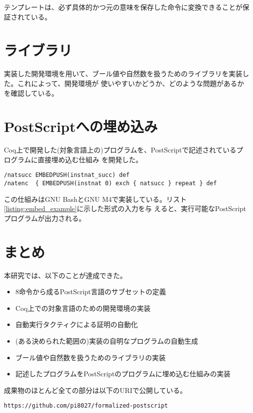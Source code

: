 \documentclass[a4paper, 10.5pt, twocolumn]{ujarticle}
\begin{document}
テンプレートは、必ず具体的かつ元の意味を保存した命令に変換できることが保証されている。

\section*{ライブラリ}

実装した開発環境を用いて、ブール値や自然数を扱うためのライブラリを実装した。これによって、開発環境が
使いやすいかどうか、どのような問題があるかを確認している。

\section*{PostScriptへの埋め込み}

Coq上で開発した(対象言語上の)プログラムを、PostScriptで記述されているプログラムに直接埋め込む仕組み
を開発した。

\begin{lstlisting}[style=plain, label=listing:embed_example, caption=PostScriptへの埋め込みの例]
/natsucc EMBEDPUSH(instnat_succ) def
/natenc  { EMBEDPUSH(instnat 0) exch { natsucc } repeat } def
\end{lstlisting}

この仕組みはGNU BashとGNU M4で実装している。リスト\ref{listing:embed_example}に示した形式の入力を与
えると、実行可能なPostScriptプログラムが出力される。

\section*{まとめ}

本研究では、以下のことが達成できた。

\begin{itemize}
 \setlength{\itemsep}{0pt}
 \setlength{\parskip}{0pt}
 \item 8命令から成るPostScript言語のサブセットの定義
 \item Coq上での対象言語のための開発環境の実装
 \item 自動実行タクティクによる証明の自動化
 \item (ある決められた範囲の)実装の自明なプログラムの自動生成
 \item ブール値や自然数を扱うためのライブラリの実装
 \item 記述したプログラムをPostScriptのプログラムに埋め込む仕組みの実装
\end{itemize}

成果物のほとんど全ての部分は以下のURIで公開している。

\texttt{https://github.com/pi8027/formalized-postscript}
\end{document}
